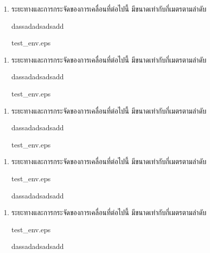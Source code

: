 \documentclass[a4paper,12pt]{book}
\begin{document}
\begin{enumerate}
\item 	\begin{ljrp} 
		 	ระยะทางและการกระจัดของการเคลื่อนที่ต่อไปนี้ มีขนาดเท่ากับกี่เมตรตามลําดับ
			\begin{4c}
				{das}{sada}{dsad}{sadd}
			\end{4c}
		\end{ljrp}
		\begin{rp}{test_env.eps}\end{rp}
\end{enumerate}
\begin{enumerate}
\item 	\begin{ljrp} 
		 	ระยะทางและการกระจัดของการเคลื่อนที่ต่อไปนี้ มีขนาดเท่ากับกี่เมตรตามลําดับ
			\begin{2c}
				{das}{sada}{dsad}{sadd}
			\end{2c}
		\end{ljrp}
		\begin{rp}{test_env.eps}\end{rp}
\end{enumerate}
\begin{enumerate}
\item 	\begin{ljrp} 
		 	ระยะทางและการกระจัดของการเคลื่อนที่ต่อไปนี้ มีขนาดเท่ากับกี่เมตรตามลําดับ
			\begin{1c}
				{das}{sada}{dsad}{sadd}
			\end{1c}
		\end{ljrp}
		\begin{rp}{test_env.eps}\end{rp}
\end{enumerate}
\begin{enumerate}
\item 	\begin{ljrp} 
		 	ระยะทางและการกระจัดของการเคลื่อนที่ต่อไปนี้ มีขนาดเท่ากับกี่เมตรตามลําดับ
		\end{ljrp}
		\begin{rp}{test_env.eps}\end{rp}
		\begin{4c}
			{das}{sada}{dsad}{sadd}
		\end{4c}
\end{enumerate}
\begin{enumerate}
\item 	\begin{ljrp} 
		 	ระยะทางและการกระจัดของการเคลื่อนที่ต่อไปนี้ มีขนาดเท่ากับกี่เมตรตามลําดับ
		\end{ljrp}
		\begin{rp}{test_env.eps}\end{rp}
		\begin{2c}
			{das}{sada}{dsad}{sadd}
		\end{2c}
\end{enumerate}
\end{document}

